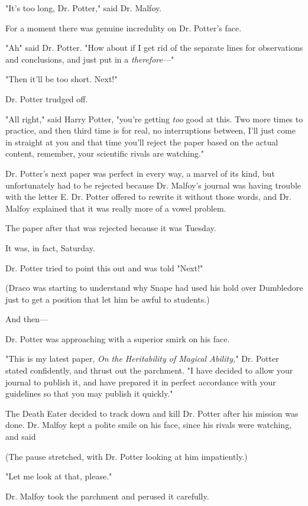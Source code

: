 "It's too long, Dr. Potter," said Dr. Malfoy.

For a moment there was genuine incredulity on Dr. Potter's face.

"Ah{\el}" said Dr. Potter. "How about if I get rid of the separate lines for
observations and conclusions, and just put in a \emph{therefore}—"

"Then it'll be too short. Next!"

Dr. Potter trudged off.

"All right," said Harry Potter, "you're getting \emph{too} good at this. Two
more times to practice, and then third time is for real, no interruptions
between, I'll just come in straight at you and that time you'll reject the
paper based on the actual content, remember, your scientific rivals are
watching."

Dr. Potter's next paper was perfect in every way, a marvel of its kind, but
unfortunately had to be rejected because Dr. Malfoy's journal was having
trouble with the letter E. Dr. Potter offered to rewrite it without those
words, and Dr. Malfoy explained that it was really more of a vowel problem.

The paper after that was rejected because it was Tuesday.

It was, in fact, Saturday.

Dr. Potter tried to point this out and was told "Next!"

(Draco was starting to understand why Snape had used his hold over Dumbledore
just to get a position that let him be awful to students.)

And then—

Dr. Potter was approaching with a superior smirk on his face.

"This is my latest paper, \emph{On the Heritability of Magical Ability,}" Dr.
Potter stated confidently, and thrust out the parchment. "I have decided to
allow your journal to publish it, and have prepared it in perfect accordance
with your guidelines so that you may publish it quickly."

The Death Eater decided to track down and kill Dr. Potter after his mission was
done. Dr. Malfoy kept a polite smile on his face, since his rivals were
watching, and said{\el}

(The pause stretched, with Dr. Potter looking at him impatiently.)

{\el} "Let me look at that, please."

Dr. Malfoy took the parchment and perused it carefully.

